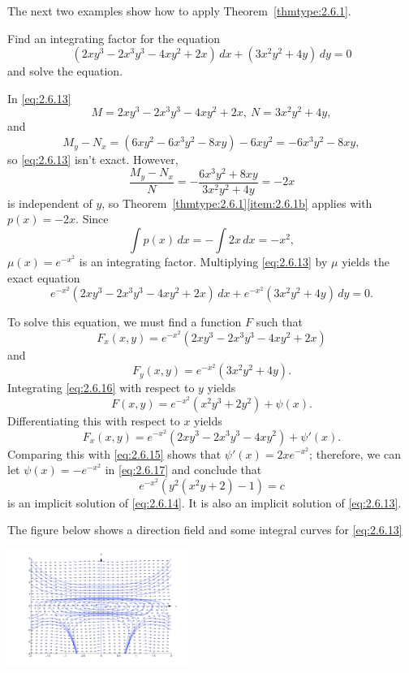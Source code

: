 \documentclass{ximera}
\begin{document}
The next two examples show how to apply
Theorem~\ref{thmtype:2.6.1}.

\begin{example}\label{example:2.6.1}
Find an integrating factor for the equation
\begin{equation}\label{eq:2.6.13}
(2xy^3-2x^3y^3-4xy^2+2x)\,dx+(3x^2y^2+4y)\,dy=0
\end{equation}
and solve the equation.
\begin{explanation}
In \eqref{eq:2.6.13}
$$
M=2xy^3-2x^3y^3-4xy^2+2x,\ N=3x^2y^2+4y,
$$
and
$$
M_y-N_x=(6xy^2-6x^3y^2-8xy)-6xy^2=-6x^3y^2-8xy,
$$
so \eqref{eq:2.6.13}  isn't  exact. However,
$$
\frac{M_y-N_x}{N}=-\frac{6x^3y^2+8xy}{3x^2y^2+4y}=-2x
$$
is independent of $y$, so Theorem~\ref{thmtype:2.6.1}\ref{item:2.6.1b} applies
with
$p(x)=-2x$. Since
$$
\int p (x)\,dx=-\int 2x\,dx=-x^2,
$$
 $\mu(x)=e^{-x^2}$ is an
integrating factor.  Multiplying \eqref{eq:2.6.13} by $\mu$ yields the
exact equation
\begin{equation}\label{eq:2.6.14}
e^{-x^2}(2xy^3-2x^3y^3-4xy^2+2x)\,dx+
 e^{-x^2}(3x^2y^2+4y)\,dy=0.
\end{equation}

To solve this equation, we must find a
function $F$ such that
\begin{equation}\label{eq:2.6.15}
F_x(x,y)=e^{-x^2}(2xy^3-2x^3y^3-4xy^2+2x)
\end{equation}
 and
\begin{equation}\label{eq:2.6.16}
F_y(x,y)=e^{-x^2}(3x^2y^2+4y).
\end{equation}
 Integrating \eqref{eq:2.6.16} with respect to $y$ yields
\begin{equation}\label{eq:2.6.17}
F(x,y)=e^{-x^2}(x^2y^3+2y^2)+\psi(x).
\end{equation}
 Differentiating this with respect to $x$ yields
$$
F_x(x,y)=e^{-x^2}(2xy^3-2x^3y^3-4xy^2)+\psi'(x).
$$
Comparing this with \eqref{eq:2.6.15} shows that $\psi'(x)=
2xe^{-x^2}$;  therefore, we can let $\psi(x)=-e^{-x^2}$ in
\eqref{eq:2.6.17} and conclude that
$$
e^{-x^2}\left(y^2(x^2y+2)-1\right)=c
$$
is an implicit solution of \eqref{eq:2.6.14}. It is also an implicit solution
of \eqref{eq:2.6.13}.

The figure below  shows a  direction field and some integral curves
for \eqref{eq:2.6.13}

\begin{image}
 \includegraphics[height=1.5in]{fig020601.jpg}
\end{image}

\end{explanation}
\end{example}
\end{document}
